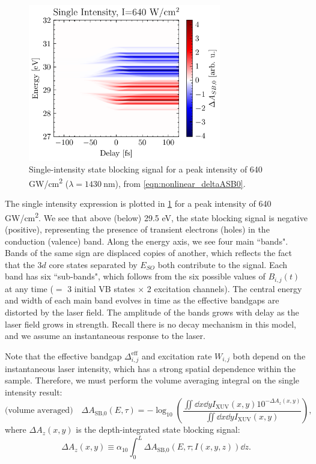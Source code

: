 \begin{figure}
	\centering
	\includegraphics[width=0.75\textwidth]{figures/chap4/dASB0_1430nm_640GWcm2.pdf}
	\caption{Single-intensity state blocking signal for a peak intensity of 640 GW/cm\textsuperscript{2} ($\lambda=1430 \ \textrm{nm}$), from \cref{eqn:nonlinear_deltaASB0}.}
	\label{fig:dASB0_1430nm_640GWcm2}
\end{figure}

The single intensity expression is plotted in \cref{fig:dASB0_1430nm_640GWcm2} for a peak intensity of 640 GW/cm\textsuperscript{2}. We see that above (below) 29.5 eV, the state blocking signal is negative (positive), representing the presence of transient electrons (holes) in the conduction (valence) band. Along the energy axis, we see four main ``bands". Bands of the same sign are displaced copies of another, which reflects the fact that the $3d$ core states separated by $E_{SO}$ both contribute to the signal. Each band has six ``sub-bands", which follows from the six possible values of $B_{i,j}(t)$ at any time ($=$ 3 initial VB states $\times$ 2 excitation channels). The central energy and width of each main band evolves in time as the effective bandgaps are distorted by the laser field. The amplitude of the bands grows with delay as the laser field grows in strength. Recall there is no decay mechanism in this model, and we assume an instantaneous response to the laser.

Note that the effective bandgap $\Delta_{i,j}^{\textrm{eff}}$ and excitation rate $W_{i,j}$ both depend on the instantaneous laser intensity, which has a strong spatial dependence within the sample. Therefore, we must perform the volume averaging integral on the single intensity result:
\begin{equation}
\label{eqn:Delta_A_5}
\textrm{(volume averaged)} \quad \Delta A_{\textrm{SB,0}}(E,\tau) = -\log_{10} \left( \frac{ \iint \dd{x} \dd{y} I_{\textrm{XUV}}(x,y) 10^{-\Delta A_z(x,y)}}{ \iint \dd{x} \dd{y} I_{\textrm{XUV}}(x,y)} \right),
\end{equation}
where $\Delta A_z(x,y)$ is the depth-integrated state blocking signal:
\begin{equation}
\Delta A_z(x,y) \equiv  \alpha_{10} \int_{0}^{L} \Delta A_{\textrm{SB,0}}(E,\tau; I(x,y,z)) \dd{z}.
\end{equation}

